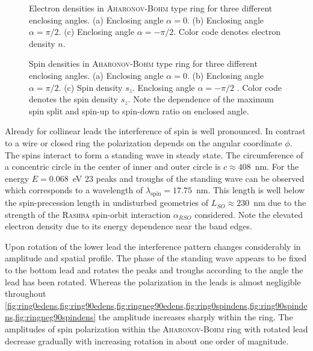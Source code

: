 \begin{figure}[h!]
\caption{Electron densities in \textsc{Aharonov-Bohm} type ring for three different enclosing angles. (a) Enclosing angle $\alpha=0$. (b) Enclosing angle $\alpha=\pi/2$. (c) Enclosing angle $\alpha=-\pi/2$. Color code denotes electron density $n$.} 
\end{figure}
\begin{figure}[h!]
\caption{Spin densities in \textsc{Aharonov-Bohm} type ring for three different enclosing angles. (a) Enclosing angle $\alpha=0$. (b) Enclosing angle $\alpha=\pi/2$. (c) Spin density $s_z$. Enclosing angle $\alpha=-\pi/2$ . Color code denotes the spin density $s_z$. Note the dependence of the maximum spin split and spin-up to spin-down ratio on enclosed angle.}
\end{figure}
Already for collinear leads the interference of spin is well pronounced. In contrast to a wire or closed ring \cite{PhysRevB.82.165322} the polarization depends on the angular coordinate $\phi$.
The spins interact to form a standing wave in steady state. The circumference of a concentric circle in the center of inner and outer circle is $c\approx 408$~nm. For the energy $E=0.068$~eV 23 peaks and troughs of the standing wave can be observed which corresponds to a wavelength of $\lambda_{\text{spin}}=17.75$~nm. This length is well below the spin-precession length in undisturbed geometries of $L_{SO}\approx230$~nm due to the strength of the \textsc{Rashba} spin-orbit interaction $\alpha_{RSO}$ considered. Note the elevated electron density due to its energy dependence near the band edges.\par
Upon rotation of the lower lead the interference pattern changes considerably in amplitude and spatial profile. The phase of the standing wave appears to be fixed to the bottom lead and rotates the peaks and troughs according to the angle the lead has been rotated. Whereas the polarization in the leads is almost negligible throughout \cref{fig:ring0edens,fig:ring90edens,fig:ringneg90edens,fig:ring0spindens,fig:ring90spindens,fig:ringneg90spindens} the amplitude increases sharply within the ring. The amplitudes of spin polarization within the \textsc{Aharonov-Bohm} ring with rotated lead decrease gradually with increasing rotation in about one order of magnitude.\par
